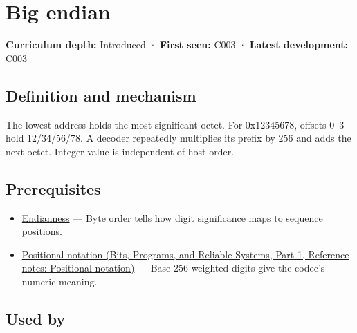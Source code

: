 \hypertarget{appendix-92e040df969a}{}\label{referencestart:appendix-92e040df969a}
\section{Big endian}\label{appendix-92e040df969a-big-endian}

\hypertarget{appendix-92e040df969a-big-endian}{}

\textbf{Curriculum depth:} Introduced · \textbf{First seen:} C003 · \textbf{Latest development:} C003

\begin{allmightroledefinition}

\subsection{Definition and mechanism}\label{appendix-92e040df969a-definition-and-mechanism}

\hypertarget{appendix-92e040df969a-definition-and-mechanism}{}

The lowest address holds the most-significant octet. For 0x12345678, offsets 0--3 hold 12/34/56/78. A decoder repeatedly multiplies its prefix by 256 and adds the next octet. Integer value is independent of host order.

\end{allmightroledefinition}

\subsection{Prerequisites}\label{appendix-92e040df969a-prerequisites}

\hypertarget{appendix-92e040df969a-prerequisites}{}

\begin{itemize}
\tightlist
\item
  \hyperref[appendix-bc07c3d25b18]{Endianness} --- Byte order tells how digit significance maps to sequence positions.
\item
  \href{../01-Bits-Programs-and-Reliable-Systems-P01/main.pdf\#appendix-83c3f28f7bda}{Positional notation (Bits, Programs, and Reliable Systems, Part 1, Reference notes: Positional notation)} --- Base-256 weighted digits give the codec's numeric meaning.
\end{itemize}

\subsection{Used by}\label{appendix-92e040df969a-used-by}

